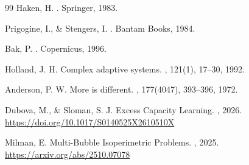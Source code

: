 \documentclass[11pt,a4paper]{article}
\begin{document}
\begin{thebibliography}{99}
Haken, H.
.
\newblock Springer, 1983.

Prigogine, I., \& Stengers, I.
.
\newblock Bantam Books, 1984.

Bak, P.
.
\newblock Copernicus, 1996.

Holland, J. H.
\newblock Complex adaptive systems.
, 121(1), 17--30, 1992.

Anderson, P. W.
\newblock More is different.
, 177(4047), 393--396, 1972.

Dubova, M., \& Sloman, S. J.
\newblock Excess Capacity Learning.
, 2026.
\newblock \url{https://doi.org/10.1017/S0140525X2610510X}

Milman, E.
\newblock Multi-Bubble Isoperimetric Problems.
, 2025.
\newblock \url{https://arxiv.org/abs/2510.07078}

\end{thebibliography}
\end{document}
